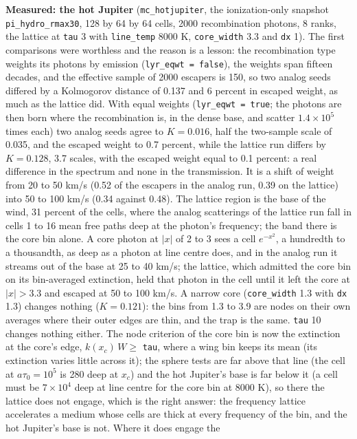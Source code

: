\documentclass[11pt]{article}
\newcommand{\key}[1]{\texttt{#1}}
\begin{document}
\textbf{Measured: the hot Jupiter} (\texttt{mc\_hotjupiter}, the ionization-only
snapshot \texttt{pi\_hydro\_rmax30}, 128 by 64 by 64 cells, 2000 recombination
photons, 8 ranks, the lattice at \key{tau} 3 with \key{line\_temp} 8000 K,
\key{core\_width} 3.3 and \key{dx} 1).  The first comparisons were worthless and
the reason is a lesson: the recombination type weights its photons by emission
(\texttt{lyr\_eqwt = false}), the weights span fifteen decades, and the effective
sample of 2000 escapers is 150, so two analog seeds differed by a Kolmogorov
distance of 0.137 and 6 percent in escaped weight, as much as the lattice did.  With
equal weights (\texttt{lyr\_eqwt = true}; the photons are then born where the
recombination is, in the dense base, and scatter $1.4\times10^5$ times each) two
analog seeds agree to $K = 0.016$, half the two-sample scale of 0.035, and the
escaped weight to 0.7 percent, while the lattice run differs by $K = 0.128$, 3.7
scales, with the escaped weight equal to 0.1 percent: a real difference in the
spectrum and none in the transmission.  It is a shift of weight from 20 to 50 km/s
(0.52 of the escapers in the analog run, 0.39 on the lattice) into 50 to 100 km/s
(0.34 against 0.48).  The lattice region is the base of the wind, 31 percent of the
cells, where the analog scatterings of the lattice run fall in cells 1 to 16 mean
free paths deep at the photon's frequency; the band there is the core bin alone.  A
core photon at $|x|$ of 2 to 3 sees a cell $e^{-x^2}$, a hundredth to a thousandth,
as deep as a photon at line centre does, and in the analog run it streams out of
the base at 25 to 40 km/s; the lattice, which admitted the core bin on its
bin-averaged extinction, held that photon in the cell until it left the core at
$|x| > 3.3$ and escaped at 50 to 100 km/s.  A narrow core (\key{core\_width} 1.3 with
\key{dx} 1.3) changes nothing ($K = 0.121$): the bins from 1.3 to 3.9 are nodes on
their own averages where their outer edges are thin, and the trap is the same.
\key{tau} 10 changes nothing either.  The node criterion of the core bin is now the
extinction at the core's edge, $k(x_c)\,W \ge$ \key{tau}, where a wing bin keeps
its mean (its extinction varies little across it); the sphere tests are far above
that line (the cell at $a\tau_0 = 10^5$ is 280 deep at $x_c$) and the hot Jupiter's
base is far below it (a cell must be $7\times10^4$ deep at line centre for the
core bin at 8000 K), so there the lattice does not engage, which is the right
answer: the frequency lattice accelerates a medium whose cells are thick at every
frequency of the bin, and the hot Jupiter's base is not.  Where it does engage the
\end{document}
